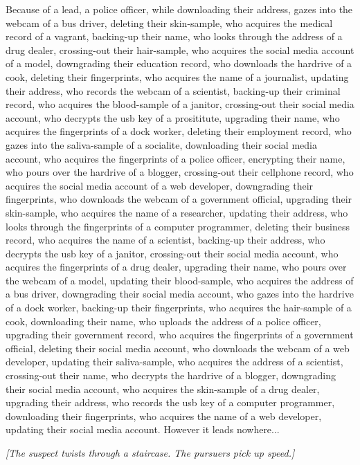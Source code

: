 \documentclass{report}
\begin{document}
Because of a lead, a police officer, while downloading their address, gazes into the webcam of a bus driver, deleting their skin-sample, who acquires the medical record of a vagrant, backing-up their name, who looks through the address of a drug dealer, crossing-out their hair-sample, who acquires the social media account of a model, downgrading their education record, who downloads the hardrive of a cook, deleting their fingerprints, who acquires the name of a journalist, updating their address, who records the webcam of a scientist, backing-up their criminal record, who acquires the blood-sample of a janitor, crossing-out their social media account, who decrypts the usb key of a prosititute, upgrading their name, who acquires the fingerprints of a dock worker, deleting their employment record, who gazes into the saliva-sample of a socialite, downloading their social media account, who acquires the fingerprints of a police officer, encrypting their name, who pours over the hardrive of a blogger, crossing-out their cellphone record, who acquires the social media account of a web developer, downgrading their fingerprints, who downloads the webcam of a government official, upgrading their skin-sample, who acquires the name of a researcher, updating their address, who looks through the fingerprints of a computer programmer, deleting their business record, who acquires the name of a scientist, backing-up their address, who decrypts the usb key of a janitor, crossing-out their social media account, who acquires the fingerprints of a drug dealer, upgrading their name, who pours over the webcam of a model, updating their blood-sample, who acquires the address of a bus driver, downgrading their social media account, who gazes into the hardrive of a dock worker, backing-up their fingerprints, who acquires the hair-sample of a cook, downloading their name, who uploads the address of a police officer, upgrading their government record, who acquires the fingerprints of a government official, deleting their social media account, who downloads the webcam of a web developer, updating their saliva-sample, who acquires the address of a scientist, crossing-out their name, who decrypts the hardrive of a blogger, downgrading their social media account, who acquires the skin-sample of a drug dealer, upgrading their address, who records the usb key of a computer programmer, downloading their fingerprints, who acquires the name of a web developer, updating their social media account. However it leads nowhere...

\textit{[The suspect twists through a staircase. The pursuers pick up speed.]}
\end{document}
